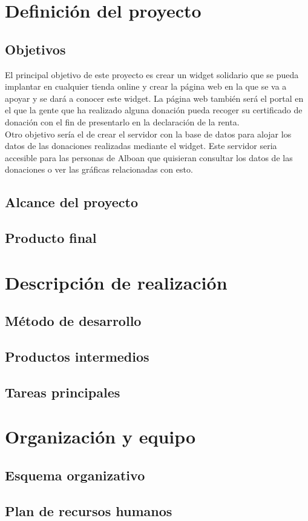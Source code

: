 \section{Definición del proyecto}

\subsection{Objetivos}
El principal objetivo de este proyecto es crear un widget solidario que se pueda implantar en cualquier tienda online y crear la página web en la que se va a apoyar y se dará a conocer este widget. La página web también será el portal en el que la gente que ha realizado alguna donación pueda recoger su certificado de donación con el fin de presentarlo en la declaración de la renta.\\

Otro objetivo sería el de crear el servidor con la base de datos para alojar los datos de las donaciones realizadas mediante el widget. Este servidor seria accesible para las personas de Alboan que quisieran consultar los datos de las donaciones o ver las gráficas relacionadas con esto.

\subsection{Alcance del proyecto}

\subsection{Producto final}

\section{Descripción de realización}

\subsection{Método de desarrollo}

\subsection{Productos intermedios}

\subsection{Tareas principales}

\section{Organización y equipo}

\subsection{Esquema organizativo}

\subsection{Plan de recursos humanos}